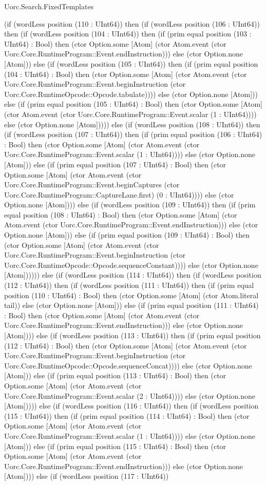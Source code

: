 \begin{lexlean}{Uorc.Search.FixedTemplates}
\begin{semanticmodule}
{(if (wordLess position (110 : UInt64)) then (if (wordLess position (106 : UInt64)) then (if (wordLess position (104 : UInt64)) then (if (prim equal position (103 : UInt64) : Bool) then (ctor Option.some [Atom] (ctor Atom.event (ctor Uorc.Core.RuntimeProgram::Event.endInstruction))) else (ctor Option.none [Atom])) else (if (wordLess position (105 : UInt64)) then (if (prim equal position (104 : UInt64) : Bool) then (ctor Option.some [Atom] (ctor Atom.event (ctor Uorc.Core.RuntimeProgram::Event.beginInstruction (ctor Uorc.Core.RuntimeOpcode::Opcode.tabulate)))) else (ctor Option.none [Atom])) else (if (prim equal position (105 : UInt64) : Bool) then (ctor Option.some [Atom] (ctor Atom.event (ctor Uorc.Core.RuntimeProgram::Event.scalar (1 : UInt64)))) else (ctor Option.none [Atom])))) else (if (wordLess position (108 : UInt64)) then (if (wordLess position (107 : UInt64)) then (if (prim equal position (106 : UInt64) : Bool) then (ctor Option.some [Atom] (ctor Atom.event (ctor Uorc.Core.RuntimeProgram::Event.scalar (1 : UInt64)))) else (ctor Option.none [Atom])) else (if (prim equal position (107 : UInt64) : Bool) then (ctor Option.some [Atom] (ctor Atom.event (ctor Uorc.Core.RuntimeProgram::Event.beginCaptures (ctor Uorc.Core.RuntimeProgram::CaptureLane.first) (0 : UInt64)))) else (ctor Option.none [Atom]))) else (if (wordLess position (109 : UInt64)) then (if (prim equal position (108 : UInt64) : Bool) then (ctor Option.some [Atom] (ctor Atom.event (ctor Uorc.Core.RuntimeProgram::Event.endInstruction))) else (ctor Option.none [Atom])) else (if (prim equal position (109 : UInt64) : Bool) then (ctor Option.some [Atom] (ctor Atom.event (ctor Uorc.Core.RuntimeProgram::Event.beginInstruction (ctor Uorc.Core.RuntimeOpcode::Opcode.sequenceConstant)))) else (ctor Option.none [Atom]))))) else (if (wordLess position (114 : UInt64)) then (if (wordLess position (112 : UInt64)) then (if (wordLess position (111 : UInt64)) then (if (prim equal position (110 : UInt64) : Bool) then (ctor Option.some [Atom] (ctor Atom.literal tail)) else (ctor Option.none [Atom])) else (if (prim equal position (111 : UInt64) : Bool) then (ctor Option.some [Atom] (ctor Atom.event (ctor Uorc.Core.RuntimeProgram::Event.endInstruction))) else (ctor Option.none [Atom]))) else (if (wordLess position (113 : UInt64)) then (if (prim equal position (112 : UInt64) : Bool) then (ctor Option.some [Atom] (ctor Atom.event (ctor Uorc.Core.RuntimeProgram::Event.beginInstruction (ctor Uorc.Core.RuntimeOpcode::Opcode.sequenceConcat)))) else (ctor Option.none [Atom])) else (if (prim equal position (113 : UInt64) : Bool) then (ctor Option.some [Atom] (ctor Atom.event (ctor Uorc.Core.RuntimeProgram::Event.scalar (2 : UInt64)))) else (ctor Option.none [Atom])))) else (if (wordLess position (116 : UInt64)) then (if (wordLess position (115 : UInt64)) then (if (prim equal position (114 : UInt64) : Bool) then (ctor Option.some [Atom] (ctor Atom.event (ctor Uorc.Core.RuntimeProgram::Event.scalar (1 : UInt64)))) else (ctor Option.none [Atom])) else (if (prim equal position (115 : UInt64) : Bool) then (ctor Option.some [Atom] (ctor Atom.event (ctor Uorc.Core.RuntimeProgram::Event.endInstruction))) else (ctor Option.none [Atom]))) else (if (wordLess position (117 : UInt64)) }
\end{semanticmodule}
\end{lexlean}
